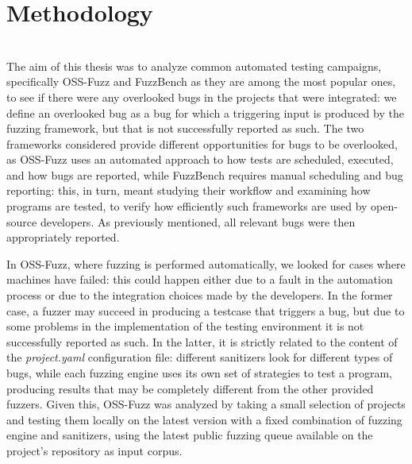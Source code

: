 \chapter{Methodology} \label{chap_3}
\ \\

The aim of this thesis was to analyze common automated testing campaigns, specifically OSS-Fuzz and FuzzBench as they are among the most popular ones, to see if there were any overlooked bugs in the projects that were integrated: we define an overlooked bug as a bug for which a triggering input is produced by the fuzzing framework, but that is not successfully reported as such. The two frameworks considered provide different opportunities for bugs to be overlooked, as OSS-Fuzz uses an automated approach to how tests are scheduled, executed, and how bugs are reported, while FuzzBench requires manual scheduling and bug reporting: this, in turn, meant studying their workflow and examining how programs are tested, to verify how efficiently such frameworks are used by open-source developers.
As previously mentioned, all relevant bugs were then appropriately reported.

In OSS-Fuzz, where fuzzing is performed automatically, we looked for cases where machines have failed: this could happen either due to a fault in the automation process or due to the integration choices made by the developers. In the former case, a fuzzer may succeed in producing a testcase that triggers a bug, but due to some problems in the implementation of the testing environment it is not successfully reported as such. In the latter, it is strictly related to the content of the \textit{project.yaml} configuration file: different sanitizers look for different types of bugs, while each fuzzing engine uses its own set of strategies to test a program, producing results that may be completely different from the other provided fuzzers. Given this, OSS-Fuzz was analyzed by taking a small selection of projects and testing them locally on the latest version with a fixed combination of fuzzing engine and sanitizers, using the latest public fuzzing queue available on the project's repository as input corpus. 

